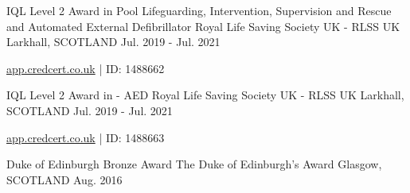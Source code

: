 
\begin{cventries}
  \cventry
    {IQL Level 2 Award in Pool Lifeguarding, Intervention, Supervision and Rescue and Automated External Defibrillator} %
    {Royal Life Saving Society UK - RLSS UK} %
    {Larkhall, SCOTLAND} %
    {Jul. 2019 - Jul. 2021} %
    {
      \begin{cvitems} %
        \item \href{https://app.credcert.co.uk/3p/rlss/}{app.credcert.co.uk} | ID: 1488662
      \end{cvitems}
    }
    
  \cventry
    {IQL Level 2 Award in  - AED} %
    {Royal Life Saving Society UK - RLSS UK} %
    {Larkhall, SCOTLAND} %
    {Jul. 2019 - Jul. 2021} %
    {
      \begin{cvitems} %
        \item \href{https://app.credcert.co.uk/3p/rlss/}{app.credcert.co.uk} | ID: 1488663
      \end{cvitems}
    }
    
  \cventry
    {Duke of Edinburgh Bronze Award} %
    {The Duke of Edinburgh's Award} %
    {Glasgow, SCOTLAND} %
    {Aug. 2016} %
    {}
\end{cventries}
\vspace{-1.5em}